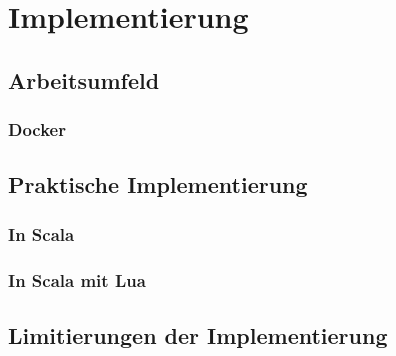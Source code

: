 \chapter{Implementierung}
\section{Arbeitsumfeld}
\subsection{Docker}
\section{Praktische Implementierung}
\subsection{In Scala}
\subsection{In Scala mit Lua}
\section{Limitierungen der Implementierung}